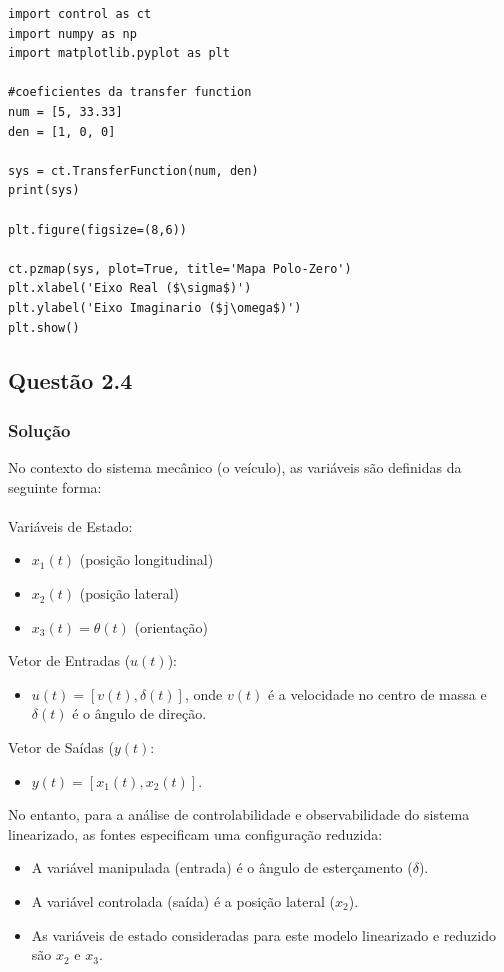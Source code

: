 \documentclass[a4paper,11pt]{article}
\begin{document}
\begin{lstlisting}[caption = {Código da Questão 2.3}, label={code:t2q3}]
import control as ct
import numpy as np
import matplotlib.pyplot as plt

#coeficientes da transfer function
num = [5, 33.33]
den = [1, 0, 0]

sys = ct.TransferFunction(num, den)
print(sys)

plt.figure(figsize=(8,6))

ct.pzmap(sys, plot=True, title='Mapa Polo-Zero')
plt.xlabel('Eixo Real ($\sigma$)')
plt.ylabel('Eixo Imaginario ($j\omega$)')
plt.show()
\end{lstlisting}

\subsection*{\sc Questão 2.4}

\subsubsection*{\sc Solução}

No contexto do sistema mecânico (o veículo), as variáveis são definidas da seguinte forma:
\\\\
Variáveis de Estado:
\begin{itemize}
    \item $x_1(t)$ (posição longitudinal)
    \item $x_2(t)$ (posição lateral)
    \item $x_3(t) = \theta(t)$ (orientação)
\end{itemize}
Vetor de Entradas ($u(t)$):
\begin{itemize}
    \item $u(t) = [v(t), \delta(t)]$, onde $v(t)$ é a velocidade no centro de massa e $\delta(t)$ é o ângulo de direção.
\end{itemize}
Vetor de Saídas ($y(t)$:
\begin{itemize}
    \item $y(t) = [x_1(t), x_2(t)]$.
\end{itemize}

No entanto, para a análise de controlabilidade e observabilidade do sistema linearizado, as fontes especificam uma configuração reduzida:
\begin{itemize}
    \item A variável manipulada (entrada) é o ângulo de esterçamento ($\delta$).
    \item A variável controlada (saída) é a posição lateral ($x_2$).
    \item As variáveis de estado consideradas para este modelo linearizado e reduzido são $x_2$ e $x_3$.
\end{itemize}
\end{document}
